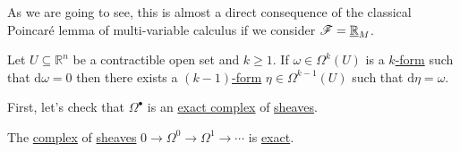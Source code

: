 \documentclass[../../main]{subfiles}
\begin{document}
As we are going to see, this is almost a direct consequence of the classical Poincaré lemma of multi-variable calculus if we consider \(\mathscr{F} = \underline{\mathbb{R}}_{M}\).
\begin{lemma}\label{lemma:poincare}
  Let \(U \subseteq \mathbb{R}^{n}\) be a contractible open set and \(k \geq 1\).
  If \(\omega \in \Omega^{k}(U)\) is a \hyperref[def:smooth-k-form]{\(k\)-form} such that \(\mathrm{d}\omega = 0\) then there exists a \hyperref[def:smooth-k-form]{\((k-1)\)-form} \(\eta \in \Omega^{k-1}(U)\) such that \(\mathrm{d}\eta = \omega\).
\end{lemma}

First, let's check that \(\Omega^{\bullet}\) is an \hyperref[def:exact-sequence]{exact complex} of \hyperref[def:sheaf]{sheaves}.
\begin{lemma} \label{lemma:de-rham-complex-exact}
  The \hyperref[def:complex]{complex} of \hyperref[def:sheaf]{sheaves} \(0 \to \Omega^{0} \to \Omega^{1} \to \cdots\) is \hyperref[def:exact-sequence]{exact}.
\end{lemma}
\end{document}
